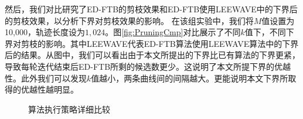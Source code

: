 然后，我们对比研究了ED-FTB的剪枝效果和ED-FTB使用LEEWAVE中的下界后的剪枝效果，以分析下界对剪枝效果的影响。
在该组实验中，我们将$M$值设置为10,000，轨迹长度设为$1,024$。图\ref{fig:PruningCmp}对比展示了不同$k$值下，不同下界对剪枝的影响。其中LEEWAVE代表ED-FTB算法使用LEEWAVE算法中的下界后的结果。从图中，我们可以看出由于本文所提出的下界比已有算法的下界更紧，导致每轮迭代结束后ED-FTB所剩的候选数更少。这说明了本文所提下界的优越性。此外我们可以发现$k$值越小，两条曲线间的间隔越大。更能说明本文下界所取得的优越性越明显。


\begin{figure} [t]
	\centering
	
	\vspace{-10pt}
	\caption{算法执行策略详细比较}
	\label{fig:components}
	\vspace{-0.5cm}
\end{figure}
